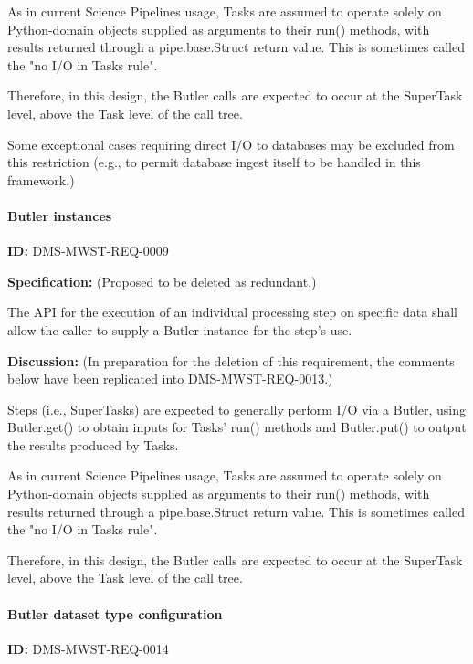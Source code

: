 \documentclass[SE,toc,lsstdraft]{lsstdoc}
\begin{document}
As in current Science Pipelines usage, Tasks are assumed to operate solely on Python-domain objects supplied as arguments to their run() methods, with results returned through a pipe.base.Struct return value. This is sometimes called the "no I/O in Tasks rule".

Therefore, in this design, the Butler calls are expected to occur at the SuperTask level, above the Task level of the call tree.

Some exceptional cases requiring direct I/O to databases may be excluded from this restriction (e.g., to permit database ingest itself to be handled in this framework.)

\paragraph{Butler instances}\hfill  %

\label{DMS-MWST-REQ-0009}
\textbf{ID:} DMS-MWST-REQ-0009

\textbf{Specification:}
(Proposed to be deleted as redundant.)

The API for the execution of an individual processing step on specific data shall allow the caller to supply a Butler instance for the step's use.

\textbf{Discussion:}
(In preparation for the deletion of this requirement, the comments below have been replicated into \hyperref[DMS-MWST-REQ-0013]{DMS-MWST-REQ-0013}.)

Steps (i.e., SuperTasks) are expected to generally perform I/O via a Butler, using Butler.get() to obtain inputs for Tasks' run() methods and Butler.put() to output the results produced by Tasks.

As in current Science Pipelines usage, Tasks are assumed to operate solely on Python-domain objects supplied as arguments to their run() methods, with results returned through a pipe.base.Struct return value. This is sometimes called the "no I/O in Tasks rule".

Therefore, in this design, the Butler calls are expected to occur at the SuperTask level, above the Task level of the call tree.

\paragraph{Butler dataset type configuration}\hfill  %

\label{DMS-MWST-REQ-0014}
\textbf{ID:} DMS-MWST-REQ-0014
\end{document}
